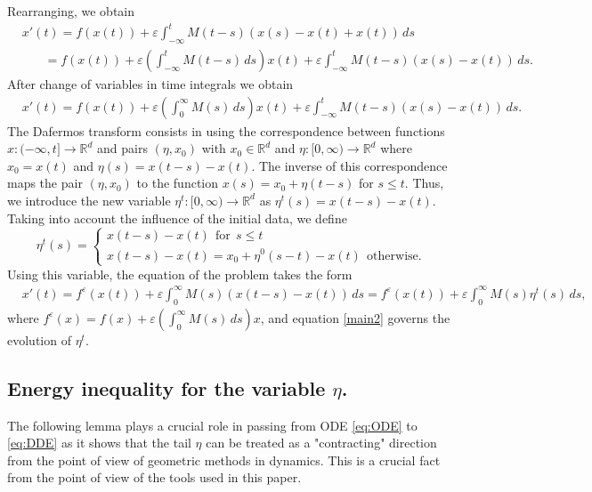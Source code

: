 \documentclass[11pt, leqno]{amsart}
\theoremstyle{definition}
\def\R{\mathbb{R}}
\begin{document}
Rearranging, we obtain
\begin{align*}
	& x'(t) = f(x(t)) + \varepsilon\int_{-\infty}^t M(t-s) (x(s)-x(t)+x(t))\, ds \\
	& \ \ \ \ \ \ \ \  = f(x(t)) + \varepsilon\left( \int_{-\infty}^t M(t-s)\, ds \right) x(t) +  \varepsilon\int_{-\infty}^t M(t-s)(x(s)-x(t))\, ds.
\end{align*}
After change of variables in time integrals we obtain
\begin{align*}
	& x'(t)  = f(x(t)) +  \varepsilon\left( \int_{0}^\infty M(s)\, ds \right) x(t)+\varepsilon\int_{-\infty}^t M(t-s)(x(s)-x(t))\, ds.
\end{align*}
 The Dafermos transform consists in using the correspondence between  functions $x:(-\infty,t] \to \R^d$ and pairs $(\eta,x_0)$ with $x_0\in \R^d$ and $\eta:[0,\infty) \to \R^d$ where $x_0=x(t)$ and $\eta(s) = x(t-s)-x(t)$. The inverse of this  correspondence maps  the pair $(\eta,x_0)$ to the function $x(s) = x_0 + \eta(t-s)$ for $s\leq t$. Thus, we  introduce the new variable
 $\eta^t:[0,\infty) \to \mathbb{R}^d$ as $\eta^t(s) = x(t-s)-x(t)$.
  Taking into account the influence of the initial data, we define
\begin{equation}\label{main2}
	\eta^t(s) = \begin{cases} x(t-s) - x(t)\ \ \textrm{for}\ \ s\leq t\\
		x(t-s) - x(t)=x_0+\eta^0(s-t)-x(t)\ \ \textrm{otherwise}.
	\end{cases}
\end{equation}
Using this variable, the equation of the problem takes the form
\begin{align}
	& x'(t)  = f^\varepsilon(x(t)) +  \varepsilon\int_{0}^\infty M(s)(x(t-s)-x(t))\, ds = f^\varepsilon(x(t)) +  \varepsilon\int_{0}^\infty M(s) \eta^t(s)\, ds ,\label{eq:main}
\end{align}
where $f^\varepsilon(x) = f(x) + \varepsilon\left( \int_{0}^\infty M(s)\, ds \right) x$, and equation \eqref{main2} governs the evolution of $\eta^t$.




\subsection{Energy inequality for the variable $\eta$.}\label{sec:memo_prop} The following lemma plays a crucial role in passing from ODE \eqref{eq:ODE} to \eqref{eq:DDE} as it shows that the tail $\eta$ can be treated
as a "contracting" direction from the point of view of geometric methods in dynamics. This is a crucial fact from the point of view of the tools used in this paper.
\end{document}
